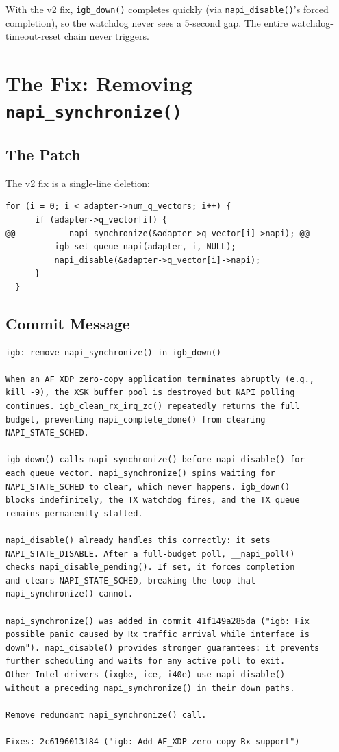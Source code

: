 \documentclass[11pt,a4paper,openany]{book}
\newcommand{\func}[1]{\texttt{#1()}}
\begin{document}
With the v2 fix, \func{igb\_down} completes quickly (via
\func{napi\_disable}'s forced completion), so the watchdog never sees
a 5-second gap.  The entire watchdog-timeout-reset chain never triggers.


\chapter{The Fix: Removing \texttt{napi\_synchronize()}}
\label{ch:fix}

\section{The Patch}

The v2 fix is a single-line deletion:

\begin{lstlisting}[caption={The v2 patch (igb\_main.c)}, style=diffstyle]
  for (i = 0; i < adapter->num_q_vectors; i++) {
      if (adapter->q_vector[i]) {
@@-          napi_synchronize(&adapter->q_vector[i]->napi);-@@
          igb_set_queue_napi(adapter, i, NULL);
          napi_disable(&adapter->q_vector[i]->napi);
      }
  }
\end{lstlisting}

\section{Commit Message}

\begin{Verbatim}[fontsize=\small]
igb: remove napi_synchronize() in igb_down()

When an AF_XDP zero-copy application terminates abruptly (e.g.,
kill -9), the XSK buffer pool is destroyed but NAPI polling
continues. igb_clean_rx_irq_zc() repeatedly returns the full
budget, preventing napi_complete_done() from clearing
NAPI_STATE_SCHED.

igb_down() calls napi_synchronize() before napi_disable() for
each queue vector. napi_synchronize() spins waiting for
NAPI_STATE_SCHED to clear, which never happens. igb_down()
blocks indefinitely, the TX watchdog fires, and the TX queue
remains permanently stalled.

napi_disable() already handles this correctly: it sets
NAPI_STATE_DISABLE. After a full-budget poll, __napi_poll()
checks napi_disable_pending(). If set, it forces completion
and clears NAPI_STATE_SCHED, breaking the loop that
napi_synchronize() cannot.

napi_synchronize() was added in commit 41f149a285da ("igb: Fix
possible panic caused by Rx traffic arrival while interface is
down"). napi_disable() provides stronger guarantees: it prevents
further scheduling and waits for any active poll to exit.
Other Intel drivers (ixgbe, ice, i40e) use napi_disable()
without a preceding napi_synchronize() in their down paths.

Remove redundant napi_synchronize() call.

Fixes: 2c6196013f84 ("igb: Add AF_XDP zero-copy Rx support")
\end{Verbatim}
\end{document}
